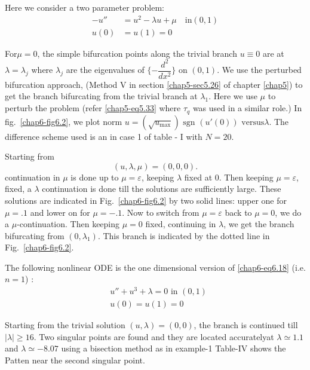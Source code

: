 \begin{exam}\label{chap6-exam2}%
 Here we consider a two parameter problem: 
\begin{equation*}
\begin{split}
 -u'' & = u^2-\lambda u+\mu  \quad \text{in}(0,1)\\
  u(0) & = u(1)=0
\end{split}\tag{6.19}\label{chap6-eq6.19}
\end{equation*}

For\pageoriginale $\mu =0$, the simple bifurcation points along the
trivial branch 
$u\equiv 0$ are at $\lambda =\lambda _j$ where $\lambda _j$ are the
eigenvalues of $\{-\dfrac{d^2}{dx^2}\}$ on $(0,1)$.  We use the
perturbed bifurcation approach, (Method V in section \ref{chap5-sec5.26} of
chapter \ref{chap5}) to get the branch bifurcating from the trivial branch at
$\lambda _1$. Here we use $\mu$ to perturb the problem (refer
\eqref{chap5-eq5.33} 
where $\tau _q$ was used in a similar role.) In
fig.~\ref{chap6-fig6.2}, we plot 
norm $u=(\sqrt {u_{\max}}) \text { sgn }(u'(0)) \text{ versus
}\lambda$. The difference scheme used is an in case 1 of table - I
with $N=20$.  

Starting from
$$
(u,\lambda, \mu )=(0,0,0).
$$
continuation in $\mu$ is done up to $\mu=\varepsilon$, keeping $\lambda$
fixed at 0. Then keeping $\mu =\varepsilon$, fixed, a $\lambda$
continuation is done till the solutions are sufficiently large. These
solutions are indicated in Fig.~\ref{chap6-fig6.2} by two solid lines: upper one
for $\mu=.1$ and lower on for $\mu=-.1$. Now to switch from $\mu =
\varepsilon$ back to $\mu=0$, we do a $\mu$-continuation. Then keeping
$\mu=0$ fixed, continuing in $\lambda$, we get the branch bifurcating
from $(0,\lambda_1)$. This branch is indicated by the dotted line in
Fig.~\ref{chap6-fig6.2}. 
\end{exam}

\begin{exam}\label{chap6-exam3}%
The following nonlinear ODE is the one dimensional version of
\eqref{chap6-eq6.18} (i.e. $n=1$) : 
\begin{equation*}
\begin{split}
& u''+u^3+\lambda =0 \text{ in }(0,1)\\
&u(0)=u(1)=0 
\end{split}\tag{6.20}\label{chap6-eq6.20}
\end{equation*}

Starting from the trivial solution $(u, \lambda)=(0,0)$, the branch is
continued till $\mid \lambda \mid\ge 16$. Two singular points are
found and they are located accurately\pageoriginale at $\lambda \simeq 1.1$ and
$\lambda \simeq - 8.07$ using a bisection method as in example-1
Table-IV shows the Patten near the second singular point.   
\end{exam}

